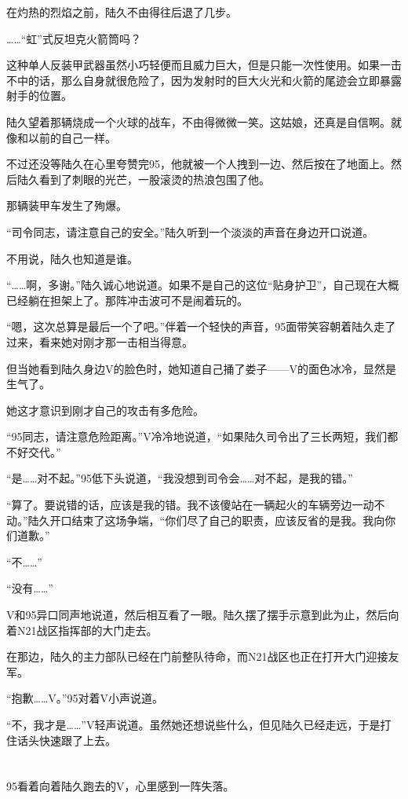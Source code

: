 在灼热的烈焰之前，陆久不由得往后退了几步。

……“虹”式反坦克火箭筒吗？

这种单人反装甲武器虽然小巧轻便而且威力巨大，但是只能一次性使用。如果一击不中的话，那么自身就很危险了，因为发射时的巨大火光和火箭的尾迹会立即暴露射手的位置。

陆久望着那辆烧成一个火球的战车，不由得微微一笑。这姑娘，还真是自信啊。就像和以前的自己一样。

不过还没等陆久在心里夸赞完95，他就被一个人拽到一边、然后按在了地面上。然后陆久看到了刺眼的光芒，一股滚烫的热浪包围了他。

那辆装甲车发生了殉爆。

“司令同志，请注意自己的安全。”陆久听到一个淡淡的声音在身边开口说道。

不用说，陆久也知道是谁。

“……啊，多谢。”陆久诚心地说道。如果不是自己的这位“贴身护卫”，自己现在大概已经躺在担架上了。那阵冲击波可不是闹着玩的。

“嗯，这次总算是最后一个了吧。”伴着一个轻快的声音，95面带笑容朝着陆久走了过来，看来她对刚才那一击相当得意。

但当她看到陆久身边V的脸色时，她知道自己捅了娄子——V的面色冰冷，显然是生气了。

她这才意识到刚才自己的攻击有多危险。

“95同志，请注意危险距离。”V冷冷地说道，“如果陆久司令出了三长两短，我们都不好交代。”

“是……对不起。”95低下头说道，“我没想到司令会……对不起，是我的错。”

“算了。要说错的话，应该是我的错。我不该傻站在一辆起火的车辆旁边一动不动。”陆久开口结束了这场争端，“你们尽了自己的职责，应该反省的是我。我向你们道歉。”

“不……”

“没有……”

V和95异口同声地说道，然后相互看了一眼。陆久摆了摆手示意到此为止，然后向着N21战区指挥部的大门走去。

在那边，陆久的主力部队已经在门前整队待命，而N21战区也正在打开大门迎接友军。

“抱歉……V。”95对着V小声说道。

“不，我才是……”V轻声说道。虽然她还想说些什么，但见陆久已经走远，于是打住话头快速跟了上去。

\section*{}

95看着向着陆久跑去的V，心里感到一阵失落。

